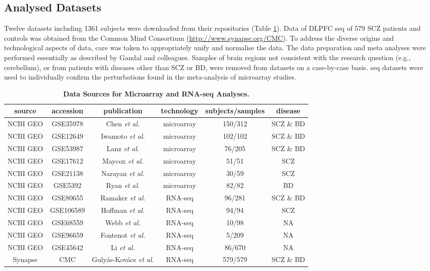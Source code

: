 \begin{method}

\subsection{Analysed Datasets}
Twelve datasets including 1361 subjects were downloaded from their repositories (Table \ref{tab:datasets}). 
Data of DLPFC \ac{seq} of 579 SCZ patients and controls was obtained from the Common Mind Consortium (\url{http://www.synapse.org/CMC}). To address the diverse origins and technological aspects of data, care was taken to appropriately unify and normalise the data. The data preparation and meta analyses were performed essentially as described by Gandal and colleagues.\cite{Gandal2018} Samples of brain regions not consistent with the research question (e.g., cerebellum), or from patients with diseases other than SCZ or BD, were removed from datasets on a case-by-case basis. \ac{seq} datasets were used to individually confirm the perturbations found in the meta-analysis of microarray studies.

\begin{table}
\sffamily
\small
\centering
\begin{tabular}{c | c | c | c | c | c}
source & accession & publication & technology & subjects/samples & disease\\ \hline
\hline
NCBI GEO & GSE35978 & Chen \emph{et al.}\cite{Chen2013} & microarray & 150/312 & SCZ \& BD\\ \hline
NCBI GEO & GSE12649 & Iwamoto \emph{et al.}\cite{Iwamoto2005} & microarray & 102/102 & SCZ \& BD\\ \hline
NCBI GEO & GSE53987 & Lanz \emph{et al.}\cite{Lanz2015} & microarray & 76/205 & SCZ \& BD\\ \hline
NCBI GEO & GSE17612 & Maycox \emph{et al.}\cite{Maycox2009} & microarray & 51/51 & SCZ\\ \hline
NCBI GEO & GSE21138 & Narayan \emph{et al.}\cite{Narayan2008} & microarray & 30/59 & SCZ\\ \hline
NCBI GEO & GSE5392 & Ryan \emph{et al.}\cite{Ryan2006} & microarray & 82/82 & BD\\ \hline
NCBI GEO & GSE80655 & Ramaker \emph{et al.}\cite{Ramaker2017} & RNA-seq & 96/281 & SCZ \& BD\\ \hline
NCBI GEO & GSE106589 & Hoffman \emph{et al.}\cite{Hoffman2017} & RNA-seq & 94/94 & SCZ\\ \hline
NCBI GEO & GSE68559 & Webb \emph{et al.}\cite{Webb2015} & RNA-seq & 10/98 & NA\\ \hline
NCBI GEO & GSE96659 & Fontenot \emph{et al.}\cite{Fontenot2017} & RNA-seq & 5/209 & NA\\ \hline
NCBI GEO & GSE45642 & Li \emph{et al.}\cite{Li2013} & RNA-seq & 86/670 & NA\\ \hline
Synapse & CMC & Gulyás-Kovács \emph{et al.}\cite{Gulyas-Kovacs2018} & RNA-seq & 579/579 & SCZ \& BD\\ \hline
\end{tabular}
\caption{\textbf{Data Sources for Microarray and RNA-seq Analyses.}}
\label{tab:datasets}
\end{table}


\end{method}
